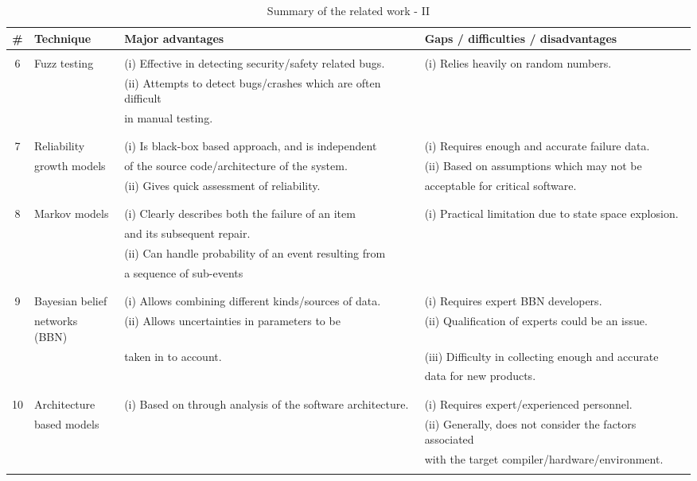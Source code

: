 \begin{sidewaystable}
\begin{centering}
\small{
\begin{tabular}{clll}
\toprule
{\bf \#}&{\bf Technique} & {\bf Major advantages} & {\bf Gaps / difficulties / disadvantages}\tabularnewline
\toprule\\
6&Fuzz testing & (i) Effective in detecting security/safety related bugs. & (i) Relies heavily on random numbers.\tabularnewline
& & (ii) Attempts to detect bugs/crashes which are often difficult&\tabularnewline
&&\quad in manual testing.&\\
& &  & \tabularnewline\hline\\
7&Reliability& (i) Is black-box based approach, and is independent & (i) Requires enough and accurate failure data.\tabularnewline
&growth models&\quad of the source code/architecture of the system.&(ii) Based on assumptions which may not be\\
& & (ii) Gives quick assessment of reliability. &\quad\quad acceptable for critical software.\\
 &&  & \tabularnewline\hline\\
8& Markov models & (i) Clearly describes both the failure of an item& (i) Practical limitation due to state space explosion.\tabularnewline
&&\qquad and its subsequent repair.&\\
 &&(ii) Can handle probability of an event resulting from&\tabularnewline
 && \qquad a sequence of sub-events& \tabularnewline
 &&& \tabularnewline\hline\\
9&Bayesian belief & (i) Allows combining different kinds/sources of data.& (i) Requires expert BBN developers.\tabularnewline
&networks (BBN) & (ii) Allows uncertainties in parameters to be& (ii) Qualification of experts could be an issue.\tabularnewline
&& \qquad taken in to account.&(iii) Difficulty in collecting enough and accurate\tabularnewline
&&&\qquad data for new products.\tabularnewline
 &&  & \tabularnewline\hline\\
10&Architecture& (i) Based on through analysis of the software architecture.& (i) Requires expert/experienced personnel.\tabularnewline
&based models& &(ii) Generally, does not consider the factors associated \tabularnewline
 && &\quad with the target compiler/hardware/environment. \tabularnewline
 && &\tabularnewline
\bottomrule
\end{tabular}}
\par\end{centering}

\caption{\label{tab:literature-review-2}Summary of the related work - II}
\end{sidewaystable}

